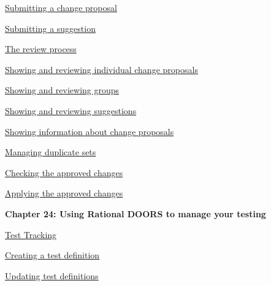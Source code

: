 \documentclass[11pt,a4paper]{article}
\begin{document}
\href{https://www.ibm.com/support/knowledgecenter/search/Submitting%20a%20change%20proposal?scope=SSYQBZ_9.6.1}{Submitting a change proposal}

\href{https://www.ibm.com/support/knowledgecenter/search/Submitting%20a%20suggestion?scope=SSYQBZ_9.6.1}{Submitting a suggestion}

\href{https://www.ibm.com/support/knowledgecenter/search/The%20review%20process?scope=SSYQBZ_9.6.1}{The review process}

\href{https://www.ibm.com/support/knowledgecenter/search/Showing%20and%20reviewing%20individual%20change%20proposals?scope=SSYQBZ_9.6.1}{Showing and reviewing individual change proposals}

\href{https://www.ibm.com/support/knowledgecenter/search/Showing%20and%20reviewing%20groups?scope=SSYQBZ_9.6.1}{Showing and reviewing groups}

\href{https://www.ibm.com/support/knowledgecenter/search/Showing%20and%20reviewing%20suggestions?scope=SSYQBZ_9.6.1}{Showing and reviewing suggestions}

\href{https://www.ibm.com/support/knowledgecenter/search/Showing%20information%20about%20change%20proposals?scope=SSYQBZ_9.6.1}{Showing information about change proposals}

\href{https://www.ibm.com/support/knowledgecenter/search/Managing%20duplicate%20sets?scope=SSYQBZ_9.6.1}{Managing duplicate sets}

\href{https://www.ibm.com/support/knowledgecenter/search/Checking%20the%20approved%20changes?scope=SSYQBZ_9.6.1}{Checking the approved changes}

\href{https://www.ibm.com/support/knowledgecenter/search/Applying%20the%20approved%20changes?scope=SSYQBZ_9.6.1}{Applying the approved changes} \\



\begin{Large}\textbf{Chapter 24: Using Rational DOORS to manage your testing} \end{Large} 
\vspace{1mm}

\href{https://www.ibm.com/support/knowledgecenter/search/Test%20Tracking?scope=SSYQBZ_9.6.1}{Test Tracking}

\href{https://www.ibm.com/support/knowledgecenter/search/Creating%20a%20test%20definition?scope=SSYQBZ_9.6.1}{Creating a test definition}

\href{https://www.ibm.com/support/knowledgecenter/search/Updating%20test%20definitions?scope=SSYQBZ_9.6.1}{Updating test definitions}
\end{document}

